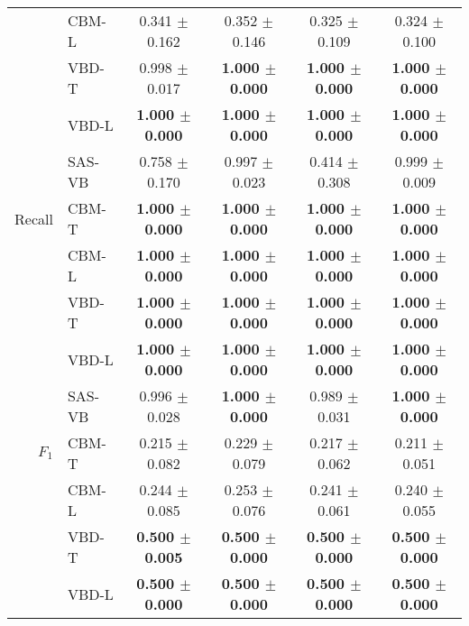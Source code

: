 \documentclass[11pt]{article}
\numberwithin{equation}{section}
\begin{document}
\begin{table}
{\begin{tabular}{r|l|cc|cc}
                & CBM-L           & 0.341 $\pm$ 0.162          & 0.352 $\pm$ 0.146          & 0.325 $\pm$ 0.109          & 0.324 $\pm$ 0.100             \\
                & VBD-T         & 0.998 $\pm$ 0.017          & \textbf{1.000 $\pm$ 0.000} & \textbf{1.000 $\pm$ 0.000} & \textbf{1.000 $\pm$ 0.000}           \\
                & VBD-L         & \textbf{1.000 $\pm$ 0.000} & \textbf{1.000 $\pm$ 0.000} & \textbf{1.000 $\pm$ 0.000} & \textbf{1.000 $\pm$ 0.000}           \\
                & SAS-VB          & 0.758 $\pm$ 0.170          & 0.997 $\pm$ 0.023          & 0.414 $\pm$ 0.308          & 0.999 $\pm$ 0.009           \\ \hline
Recall          & CBM-T           & \textbf{1.000 $\pm$ 0.000} & \textbf{1.000 $\pm$ 0.000} & \textbf{1.000 $\pm$ 0.000} & \textbf{1.000 $\pm$ 0.000}           \\
                & CBM-L           & \textbf{1.000 $\pm$ 0.000} & \textbf{1.000 $\pm$ 0.000} & \textbf{1.000 $\pm$ 0.000} & \textbf{1.000 $\pm$ 0.000}           \\
                & VBD-T         & \textbf{1.000 $\pm$ 0.000} & \textbf{1.000 $\pm$ 0.000} & \textbf{1.000 $\pm$ 0.000} & \textbf{1.000 $\pm$ 0.000}           \\
                & VBD-L         & \textbf{1.000 $\pm$ 0.000} & \textbf{1.000 $\pm$ 0.000} & \textbf{1.000 $\pm$ 0.000} & \textbf{1.000 $\pm$ 0.000}           \\
                & SAS-VB          & 0.996 $\pm$ 0.028          & \textbf{1.000 $\pm$ 0.000} & 0.989 $\pm$ 0.031          & \textbf{1.000 $\pm$ 0.000}           \\ \hline
$F_1$           & CBM-T           & 0.215 $\pm$ 0.082          & 0.229 $\pm$ 0.079          & 0.217 $\pm$ 0.062          & 0.211 $\pm$ 0.051             \\
                & CBM-L           & 0.244 $\pm$ 0.085          & 0.253 $\pm$ 0.076          & 0.241 $\pm$ 0.061          & 0.240 $\pm$ 0.055             \\
                & VBD-T         & \textbf{0.500 $\pm$ 0.005} & \textbf{0.500 $\pm$ 0.000} & \textbf{0.500 $\pm$ 0.000} & \textbf{0.500 $\pm$ 0.000}           \\
                & VBD-L         & \textbf{0.500 $\pm$ 0.000} & \textbf{0.500 $\pm$ 0.000} & \textbf{0.500 $\pm$ 0.000} & \textbf{0.500 $\pm$ 0.000}           \\

\end{tabular}}
\end{table}
\end{document}
